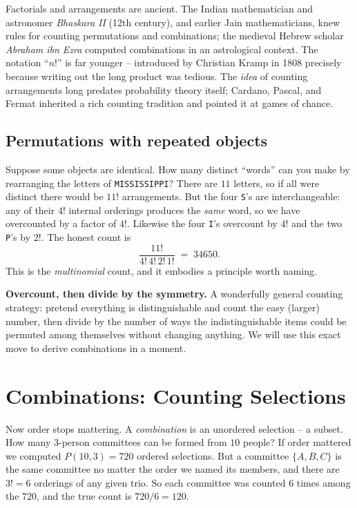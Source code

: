 \begin{historybox}
Factorials and arrangements are ancient. The Indian mathematician and astronomer
\emph{Bhaskara II} (12th century), and earlier Jain mathematicians, knew rules for
counting permutations and combinations; the medieval Hebrew scholar \emph{Abraham ibn Ezra}
computed combinations in an astrological context. The notation ``$n!$'' is far younger --
introduced by Christian Kramp in 1808 precisely because writing out the long product was
tedious. The \emph{idea} of counting arrangements long predates probability theory itself;
Cardano, Pascal, and Fermat inherited a rich counting tradition and pointed it at games of
chance.
\end{historybox}

\subsection{Permutations with repeated objects}

Suppose some objects are identical. How many distinct ``words'' can you make by rearranging
the letters of \texttt{MISSISSIPPI}? There are $11$ letters, so if all were distinct there
would be $11!$ arrangements. But the four \texttt{S}'s are interchangeable: any of their
$4!$ internal orderings produces the \emph{same} word, so we have overcounted by a factor
of $4!$. Likewise the four \texttt{I}'s overcount by $4!$ and the two \texttt{P}'s by $2!$.
The honest count is
\[
  \frac{11!}{4!\,4!\,2!\,1!} \;=\; 34650.
\]
This is the \emph{multinomial} count, and it embodies a principle worth naming.

\begin{intuitionbox}
\textbf{Overcount, then divide by the symmetry.} A wonderfully general counting strategy:
pretend everything is distinguishable and count the easy (larger) number, then divide by
the number of ways the indistinguishable items could be permuted among themselves without
changing anything. We will use this exact move to derive combinations in a moment.
\end{intuitionbox}

\section{Combinations: Counting Selections}
\label{ch2:combinations}

Now order stops mattering. A \emph{combination} is an unordered selection -- a subset. How
many $3$-person committees can be formed from $10$ people? If order mattered we computed
$P(10,3) = 720$ ordered selections. But a committee $\{A,B,C\}$ is the same committee no
matter the order we named its members, and there are $3! = 6$ orderings of any given trio.
So each committee was counted $6$ times among the $720$, and the true count is $720/6 = 120$.

